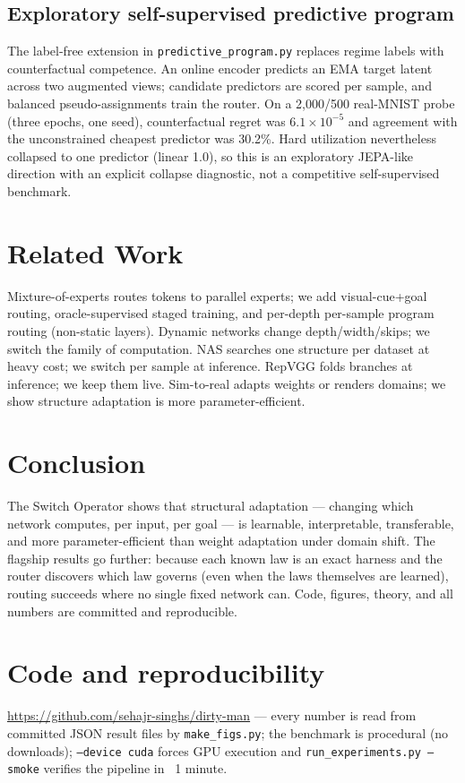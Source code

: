 \documentclass[conference,10pt]{IEEEtran}
\begin{document}
\subsection{Exploratory self-supervised predictive program}
The label-free extension in \texttt{predictive\_program.py} replaces regime
labels with counterfactual competence. An online encoder predicts an EMA target
latent across two augmented views; candidate predictors are scored per sample,
and balanced pseudo-assignments train the router. On a 2{,}000/500 real-MNIST
probe (three epochs, one seed), counterfactual regret was $6.1\times10^{-5}$
and agreement with the unconstrained cheapest predictor was 30.2\%. Hard
utilization nevertheless collapsed to one predictor (linear 1.0), so
this is an exploratory JEPA-like direction with an explicit collapse diagnostic,
not a competitive self-supervised benchmark.

\section{Related Work}
Mixture-of-experts \cite{switchtransformer,condcomp} routes tokens to parallel experts; we add visual-cue+goal routing, oracle-supervised staged training, and per-depth per-sample program routing (non-static layers). Dynamic networks \cite{dynamicnn} change depth/width/skips; we switch the family of computation. NAS \cite{nas} searches one structure per dataset at heavy cost; we switch per sample at inference. RepVGG \cite{repvgg} folds branches at inference; we keep them live. Sim-to-real \cite{domainrand,sim2real} adapts weights or renders domains; we show structure adaptation is more parameter-efficient.

\section{Conclusion}
The Switch Operator shows that structural adaptation --- changing which network computes, per input, per goal --- is learnable, interpretable, transferable, and more parameter-efficient than weight adaptation under domain shift. The flagship results go further: because each known law is an exact harness and the router discovers which law governs (even when the laws themselves are learned), routing succeeds where no single fixed network can. Code, figures, theory, and all numbers are committed and reproducible.

\section*{Code and reproducibility}
\url{https://github.com/sehajr-singhs/dirty-man} --- every number is read from committed JSON result files by \texttt{make\_figs.py}; the benchmark is procedural (no downloads); \texttt{--device cuda} forces GPU execution and \texttt{run\_experiments.py --smoke} verifies the pipeline in ~1 minute.
\end{document}
